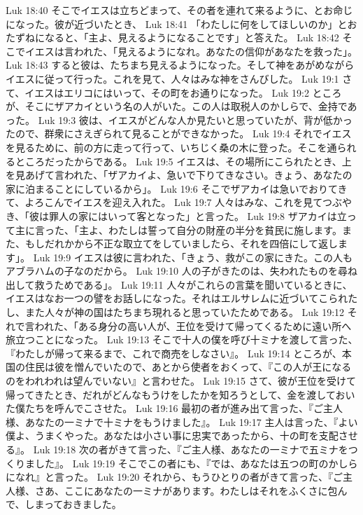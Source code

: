 Luk 18:40  そこでイエスは立ちどまって、その者を連れて来るように、とお命じになった。彼が近づいたとき、
Luk 18:41  「わたしに何をしてほしいのか」とおたずねになると、「主よ、見えるようになることです」と答えた。
Luk 18:42  そこでイエスは言われた、「見えるようになれ。あなたの信仰があなたを救った」。
Luk 18:43  すると彼は、たちまち見えるようになった。そして神をあがめながらイエスに従って行った。これを見て、人々はみな神をさんびした。
Luk 19:1  さて、イエスはエリコにはいって、その町をお通りになった。
Luk 19:2  ところが、そこにザアカイという名の人がいた。この人は取税人のかしらで、金持であった。
Luk 19:3  彼は、イエスがどんな人か見たいと思っていたが、背が低かったので、群衆にさえぎられて見ることができなかった。
Luk 19:4  それでイエスを見るために、前の方に走って行って、いちじく桑の木に登った。そこを通られるところだったからである。
Luk 19:5  イエスは、その場所にこられたとき、上を見あげて言われた、「ザアカイよ、急いで下りてきなさい。きょう、あなたの家に泊まることにしているから」。
Luk 19:6  そこでザアカイは急いでおりてきて、よろこんでイエスを迎え入れた。
Luk 19:7  人々はみな、これを見てつぶやき、「彼は罪人の家にはいって客となった」と言った。
Luk 19:8  ザアカイは立って主に言った、「主よ、わたしは誓って自分の財産の半分を貧民に施します。また、もしだれかから不正な取立てをしていましたら、それを四倍にして返します」。
Luk 19:9  イエスは彼に言われた、「きょう、救がこの家にきた。この人もアブラハムの子なのだから。
Luk 19:10  人の子がきたのは、失われたものを尋ね出して救うためである」。
Luk 19:11  人々がこれらの言葉を聞いているときに、イエスはなお一つの譬をお話しになった。それはエルサレムに近づいてこられたし、また人々が神の国はたちまち現れると思っていたためである。
Luk 19:12  それで言われた、「ある身分の高い人が、王位を受けて帰ってくるために遠い所へ旅立つことになった。
Luk 19:13  そこで十人の僕を呼び十ミナを渡して言った、『わたしが帰って来るまで、これで商売をしなさい』。
Luk 19:14  ところが、本国の住民は彼を憎んでいたので、あとから使者をおくって、『この人が王になるのをわれわれは望んでいない』と言わせた。
Luk 19:15  さて、彼が王位を受けて帰ってきたとき、だれがどんなもうけをしたかを知ろうとして、金を渡しておいた僕たちを呼んでこさせた。
Luk 19:16  最初の者が進み出て言った、『ご主人様、あなたの一ミナで十ミナをもうけました』。
Luk 19:17  主人は言った、『よい僕よ、うまくやった。あなたは小さい事に忠実であったから、十の町を支配させる』。
Luk 19:18  次の者がきて言った、『ご主人様、あなたの一ミナで五ミナをつくりました』。
Luk 19:19  そこでこの者にも、『では、あなたは五つの町のかしらになれ』と言った。
Luk 19:20  それから、もうひとりの者がきて言った、『ご主人様、さあ、ここにあなたの一ミナがあります。わたしはそれをふくさに包んで、しまっておきました。
